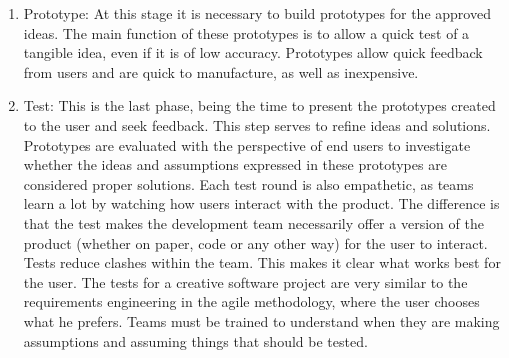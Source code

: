 \documentclass[conference]{IEEEtran}
\begin{document}
\begin{enumerate}
\item Prototype: At this stage it is necessary to build prototypes for the approved ideas. The main function of these prototypes is to allow a quick test of a tangible idea, even if it is of low accuracy. Prototypes allow quick feedback from users and are quick to manufacture, as well as inexpensive.


\item Test: This is the last phase, being the time to present the prototypes created to the user and seek feedback. This step serves to refine ideas and solutions. Prototypes are evaluated with the perspective of end users to investigate whether the ideas and assumptions expressed in these prototypes are considered proper solutions. Each test round is also empathetic, as teams learn a lot by watching how users interact with the product. The difference is that the test makes the development team necessarily offer a version of the product (whether on paper, code or any other way) for the user to interact. Tests reduce clashes within the team. This makes it clear what works best for the user. The tests for a creative software project are very similar to the requirements engineering in the agile methodology, where the user chooses what he prefers. Teams must be trained to understand when they are making assumptions and assuming things that should be tested.

\end{enumerate}
\end{document}
